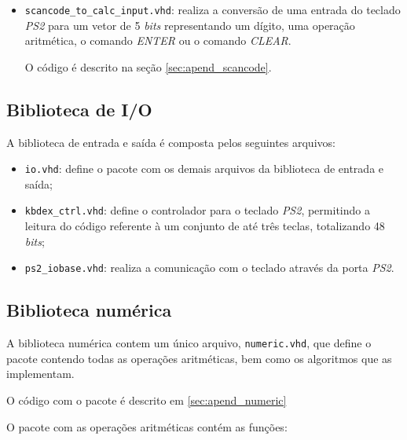 \documentclass[a4paper,11pt]{article}
\begin{document}
\begin{itemize}
	\item \texttt{scancode_to_calc_input.vhd}: realiza a conversão de uma entrada do teclado \textit{PS2} para um vetor de 5 \textit{bits} representando um dígito, uma operação aritmética, o comando \textit{ENTER} ou o comando \textit{CLEAR}.
	
	O código é descrito na seção \ref{sec:apend_scancode}.
\end{itemize}

\subsection{Biblioteca de I/O}

A biblioteca de entrada e saída é composta pelos seguintes arquivos:

\begin{itemize}
	\item \texttt{io.vhd}: define o pacote com os demais arquivos da biblioteca de entrada e saída;
	\item \texttt{kbdex_ctrl.vhd}: define o controlador para o teclado \textit{PS2}, permitindo a leitura do código referente à um conjunto de até três teclas, totalizando 48 \textit{bits};
	\item \texttt{ps2_iobase.vhd}: realiza a comunicação com o teclado através da porta \textit{PS2}.
\end{itemize}

\subsection{Biblioteca numérica}

A biblioteca numérica contem um único arquivo, \texttt{numeric.vhd}, que define o pacote contendo todas as operações aritméticas, bem como os algoritmos que as implementam.

O código com o pacote é descrito em \ref{sec:apend_numeric}

O pacote com as operações aritméticas contém as funções:
\end{document}
